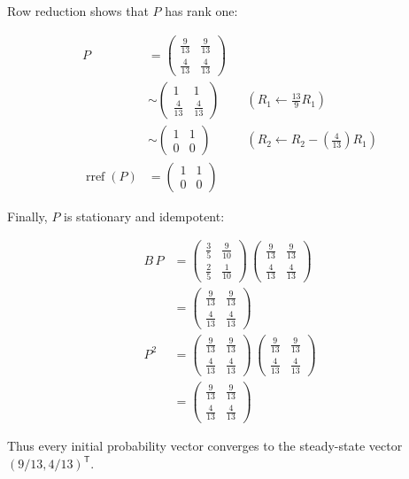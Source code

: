 \documentclass[11pt]{article}
\begin{document}
Row reduction shows that \(P\) has rank one:

\[\begin{aligned}P &= \begin{pmatrix}\frac{9}{13} & \frac{9}{13} \\ \frac{4}{13} & \frac{4}{13}\end{pmatrix} \\
&\sim \begin{pmatrix}1 & 1 \\ \frac{4}{13} & \frac{4}{13}\end{pmatrix} && \left(R_{1}\leftarrow \frac{13}{9}R_{1}\right) \\
&\sim \begin{pmatrix}1 & 1 \\ 0 & 0\end{pmatrix} && \left(R_{2}\leftarrow R_{2}-\left(\frac{4}{13}\right)R_{1}\right) \\
\operatorname{rref}\left(P\right) &= \begin{pmatrix}1 & 1 \\ 0 & 0\end{pmatrix}\end{aligned}\]

Finally, \(P\) is stationary and idempotent:

\begin{align*}B\,P &= \begin{pmatrix}\frac{3}{5} & \frac{9}{10} \\ \frac{2}{5} & \frac{1}{10}\end{pmatrix}\,\begin{pmatrix}\frac{9}{13} & \frac{9}{13} \\ \frac{4}{13} & \frac{4}{13}\end{pmatrix} \\
&= \begin{pmatrix}\frac{9}{13} & \frac{9}{13} \\ \frac{4}{13} & \frac{4}{13}\end{pmatrix} \\
P^{2} &= \begin{pmatrix}\frac{9}{13} & \frac{9}{13} \\ \frac{4}{13} & \frac{4}{13}\end{pmatrix}\,\begin{pmatrix}\frac{9}{13} & \frac{9}{13} \\ \frac{4}{13} & \frac{4}{13}\end{pmatrix} \\
&= \begin{pmatrix}\frac{9}{13} & \frac{9}{13} \\ \frac{4}{13} & \frac{4}{13}\end{pmatrix}\end{align*}

Thus every initial probability vector converges to the steady-state vector \((9/13,4/13)^{\mathsf T}\).
\end{document}
